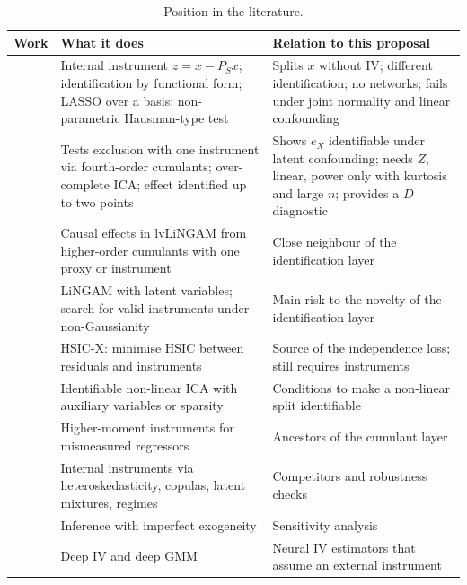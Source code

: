 \documentclass[11pt]{article}
\theoremstyle{definition}
\theoremstyle{remark}
\begin{document}
\begin{table}[ht]
\centering
\small
\caption{Position in the literature.}\label{tab:lit}
\begin{tabularx}{\textwidth}{@{}>{\raggedright\arraybackslash}p{3.6cm} X X@{}}
\toprule
Work & What it does & Relation to this proposal \\
\midrule
\citet{dong2026sp} & Internal instrument $z = x - P_Sx$; identification by functional form; LASSO over a basis; non-parametric Hausman-type test & Splits $x$ without IV; different identification; no networks; fails under joint normality and linear confounding \\
\citet{delbianco2026} & Tests exclusion with one instrument via fourth-order cumulants; over-complete ICA; effect identified up to two points & Shows $e_X$ identifiable under latent confounding; needs $Z$, linear, power only with kurtosis and large $n$; provides a $D$ diagnostic \\
\citet{tramontano2025} & Causal effects in lvLiNGAM from higher-order cumulants with one proxy or instrument & Close neighbour of the identification layer \\
\citet{hoyer2008,salehkaleybar2020,wang2023,silva2017} & LiNGAM with latent variables; search for valid instruments under non-Gaussianity & Main risk to the novelty of the identification layer \\
\citet{saengkyongam2022} & HSIC-X: minimise HSIC between residuals and instruments & Source of the independence loss; still requires instruments \\
\citet{hyvarinen2019,khemakhem2020,zheng2022} & Identifiable non-linear ICA with auxiliary variables or sparsity & Conditions to make a non-linear split identifiable \\
\citet{lewbel1997,erickson2002} & Higher-moment instruments for mismeasured regressors & Ancestors of the cumulant layer \\
\citet{lewbel2012,parkgupta2012,ebbes2005,rigobon2003} & Internal instruments via heteroskedasticity, copulas, latent mixtures, regimes & Competitors and robustness checks \\
\citet{conley2012,nevo2012} & Inference with imperfect exogeneity & Sensitivity analysis \\
\citet{hartford2017,bennett2019} & Deep IV and deep GMM & Neural IV estimators that assume an external instrument \\
\bottomrule
\end{tabularx}
\end{table}
\end{document}
